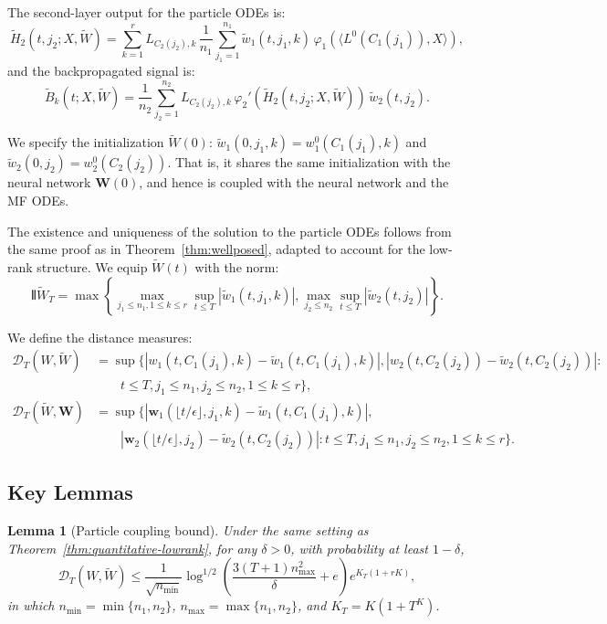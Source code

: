 \documentclass[nohyperref]{article}
\theoremstyle{plain}
\newtheorem{lemma}[theorem]{Lemma}
\theoremstyle{definition}
\theoremstyle{remark}
\begin{document}
The second-layer output for the particle ODEs is:
\[
\tilde{H}_2(t, j_2; X, \tilde{W}) = \sum_{k=1}^r L_{C_2(j_2),k}\,\frac{1}{n_1}\sum_{j_1=1}^{n_1} \tilde{w}_1(t, j_1, k)\,\varphi_1(\langle L^0(C_1(j_1)), X\rangle),
\]
and the backpropagated signal is:
\[
\tilde{B}_k(t; X, \tilde{W}) = \frac{1}{n_2}\sum_{j_2=1}^{n_2} L_{C_2(j_2),k}\,\varphi_2'(\tilde{H}_2(t, j_2; X, \tilde{W}))\,\tilde{w}_2(t, j_2).
\]

We specify the initialization $\tilde{W}(0)$: $\tilde{w}_1(0, j_1, k) = w_1^0(C_1(j_1), k)$ and $\tilde{w}_2(0, j_2) = w_2^0(C_2(j_2))$. That is, it shares the same initialization with the neural network $\mathbf{W}(0)$, and hence is coupled with the neural network and the MF ODEs.

The existence and uniqueness of the solution to the particle ODEs follows from the same proof as in Theorem~\ref{thm:wellposed}, adapted to account for the low-rank structure. We equip $\tilde{W}(t)$ with the norm:
\[
{\interleave{\tilde{W}}}_T = \max\left\{\max_{j_1 \le n_1, 1 \le k \le r}\sup_{t \le T}|\tilde{w}_1(t, j_1, k)|, \max_{j_2 \le n_2}\sup_{t \le T}|\tilde{w}_2(t, j_2)|\right\}.
\]

We define the distance measures:
\begin{align*}
\mathscr{D}_T(W, \tilde{W}) &= \sup\Big\{|w_1(t, C_1(j_1), k) - \tilde{w}_1(t, C_1(j_1), k)|, |w_2(t, C_2(j_2)) - \tilde{w}_2(t, C_2(j_2))|:\\
&\qquad t \le T, j_1 \le n_1, j_2 \le n_2, 1 \le k \le r\Big\},\\
\mathscr{D}_T(\tilde{W}, \mathbf{W}) &= \sup\Big\{|\mathbf{w}_1(\lfloor t/\epsilon\rfloor, j_1, k) - \tilde{w}_1(t, C_1(j_1), k)|,\\
&\qquad |\mathbf{w}_2(\lfloor t/\epsilon\rfloor, j_2) - \tilde{w}_2(t, C_2(j_2))|: t \le T, j_1 \le n_1, j_2 \le n_2, 1 \le k \le r\Big\}.
\end{align*}

\subsection{Key Lemmas}

\begin{lemma}[Particle coupling bound]
\label{lem:particle-lowrank}
Under the same setting as Theorem~\ref{thm:quantitative-lowrank}, for any $\delta > 0$, with probability at least $1-\delta$,
\[
\mathscr{D}_T(W, \tilde{W}) \le \frac{1}{\sqrt{n_{\min}}}\log^{1/2}\left(\frac{3(T+1)n_{\max}^2}{\delta} + e\right)e^{K_T(1+rK)},
\]
in which $n_{\min} = \min\{n_1, n_2\}$, $n_{\max} = \max\{n_1, n_2\}$, and $K_T = K(1+T^K)$.
\end{lemma}
\end{document}
